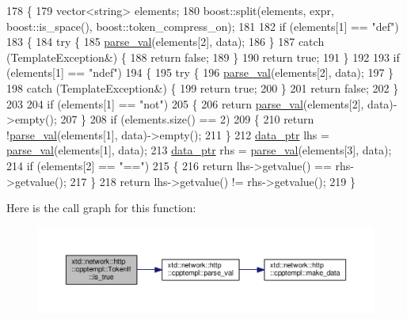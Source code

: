 \begin{DoxyCode}
178 \{
179   vector<string> elements;
180   boost::split(elements, expr, boost::is\_space(), boost::token\_compress\_on);
181 
182   \textcolor{keywordflow}{if} (elements[1] == \textcolor{stringliteral}{"def"})
183   \{
184     \textcolor{keywordflow}{try} \{
185       \hyperlink{namespacextd_1_1network_1_1http_1_1cpptempl_af79d10d06cd5bc9ce629bb2d21fbcfd6}{parse\_val}(elements[2], data);
186     \}
187     \textcolor{keywordflow}{catch} (TemplateException&) \{
188       \textcolor{keywordflow}{return} \textcolor{keyword}{false};
189     \}
190     \textcolor{keywordflow}{return} \textcolor{keyword}{true};
191   \}
192 
193   \textcolor{keywordflow}{if} (elements[1] == \textcolor{stringliteral}{"ndef"})
194   \{
195     \textcolor{keywordflow}{try} \{
196       \hyperlink{namespacextd_1_1network_1_1http_1_1cpptempl_af79d10d06cd5bc9ce629bb2d21fbcfd6}{parse\_val}(elements[2], data);
197     \}
198     \textcolor{keywordflow}{catch} (TemplateException&) \{
199       \textcolor{keywordflow}{return} \textcolor{keyword}{true};
200     \}
201     \textcolor{keywordflow}{return} \textcolor{keyword}{false};
202   \}
203 
204   \textcolor{keywordflow}{if} (elements[1] == \textcolor{stringliteral}{"not"})
205   \{
206     \textcolor{keywordflow}{return} \hyperlink{namespacextd_1_1network_1_1http_1_1cpptempl_af79d10d06cd5bc9ce629bb2d21fbcfd6}{parse\_val}(elements[2], data)->empty();
207   \}
208   \textcolor{keywordflow}{if} (elements.size() == 2)
209   \{
210     \textcolor{keywordflow}{return} !\hyperlink{namespacextd_1_1network_1_1http_1_1cpptempl_af79d10d06cd5bc9ce629bb2d21fbcfd6}{parse\_val}(elements[1], data)->empty();
211   \}
212   \hyperlink{namespacextd_1_1network_1_1http_1_1cpptempl_ad2f49991f1902699a98cf62bf0ae7ce6}{data\_ptr} lhs = \hyperlink{namespacextd_1_1network_1_1http_1_1cpptempl_af79d10d06cd5bc9ce629bb2d21fbcfd6}{parse\_val}(elements[1], data);
213   \hyperlink{namespacextd_1_1network_1_1http_1_1cpptempl_ad2f49991f1902699a98cf62bf0ae7ce6}{data\_ptr} rhs = \hyperlink{namespacextd_1_1network_1_1http_1_1cpptempl_af79d10d06cd5bc9ce629bb2d21fbcfd6}{parse\_val}(elements[3], data);
214   \textcolor{keywordflow}{if} (elements[2] == \textcolor{stringliteral}{"=="})
215   \{
216     \textcolor{keywordflow}{return} lhs->getvalue() == rhs->getvalue();
217   \}
218   \textcolor{keywordflow}{return} lhs->getvalue() != rhs->getvalue();
219 \}
\end{DoxyCode}


Here is the call graph for this function\+:
\nopagebreak
\begin{figure}[H]
\begin{center}
\leavevmode
\includegraphics[width=350pt]{classxtd_1_1network_1_1http_1_1cpptempl_1_1TokenIf_aa803ceac00459d9ceae20b64e4e366e7_cgraph}
\end{center}
\end{figure}


